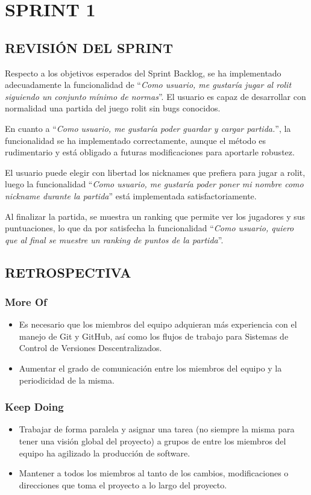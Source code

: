 \documentclass[../../SCRUM.tex]{subfiles}
\begin{document}
\section{SPRINT 1}
\subsection{REVISIÓN DEL SPRINT}
Respecto a los objetivos esperados del Sprint Backlog, se ha implementado adecuadamente la funcionalidad de ``\textit{Como usuario, me gustaría jugar al rolit siguiendo un conjunto mínimo de normas}''. El usuario es capaz de desarrollar con normalidad una partida del juego rolit sin bugs  conocidos.

En cuanto a ``\textit{Como usuario, me gustaría poder guardar y cargar partida.}'', la funcionalidad se ha implementado correctamente, aunque el método es rudimentario y está obligado a futuras modificaciones para aportarle robustez.

El usuario puede elegir con libertad los nicknames que prefiera para jugar a rolit, luego la funcionalidad ``\textit{Como usuario, me gustaría poder poner mi nombre como nickname durante la partida}'' está implementada satisfactoriamente.

Al finalizar la partida, se muestra un ranking que permite ver los jugadores y sus puntuaciones, lo que da por satisfecha la funcionalidad ``\textit{Como usuario, quiero que al final se muestre un ranking de puntos de la partida}''.

\subsection{RETROSPECTIVA}
\subsubsection{More Of}
\begin{itemize}
\item Es necesario que los miembros del equipo adquieran más experiencia con el manejo de Git y GitHub, así como los flujos de trabajo para Sistemas de Control de Versiones Descentralizados.

\item Aumentar el grado de comunicación entre los miembros del equipo y la periodicidad de la misma.

\end{itemize}
\subsubsection{Keep Doing}
\begin{itemize}
\item Trabajar de forma paralela y asignar una tarea (no siempre la misma para tener una visión global del proyecto) a grupos de entre los miembros del equipo ha agilizado la producción de software.

\item Mantener a todos los miembros al tanto de los cambios, modificaciones o direcciones que toma el proyecto a lo largo del proyecto.
\end{itemize}
\end{document}
